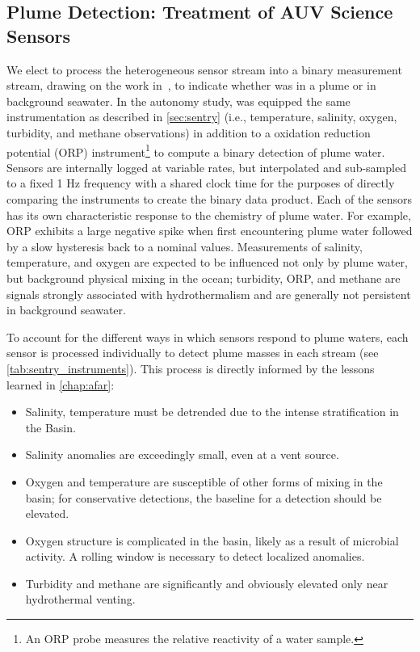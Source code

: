\subsection{Plume Detection: Treatment of AUV \Sentry Science Sensors}
\label{sec:field_sensor_models}
We elect to process the heterogeneous sensor stream into a binary measurement stream, drawing on the work in~\cite{jakuba2007stochastic}, to indicate whether \Sentry was in a plume or in background seawater. In the autonomy study, \Sentry was equipped the same instrumentation as described in \cref{sec:sentry} (i.e., temperature, salinity, oxygen, turbidity, and methane observations) in addition to a oxidation reduction potential (ORP) instrument\footnote{An ORP probe measures the relative reactivity of a water sample.} to compute a binary detection of plume water. Sensors are internally logged at variable rates, but interpolated and sub-sampled to a fixed 1 Hz frequency with a shared clock time for the purposes of directly comparing the instruments to create the binary data product. Each of the sensors has its own characteristic response to the chemistry of plume water. For example, ORP exhibits a large negative spike when first encountering plume water followed by a slow hysteresis back to a nominal values. Measurements of salinity, temperature, and oxygen are expected to be influenced not only by plume water, but background physical mixing in the ocean\autocite{li2020increasing,speer1989model}; turbidity, ORP, and methane are signals strongly associated with hydrothermalism and are generally not persistent in background seawater.

To account for the different ways in which sensors respond to plume waters, each sensor is processed individually to detect plume masses in each stream (see \cref{tab:sentry_instruments}). This process is directly informed by the lessons learned in \cref{chap:afar}:
\begin{itemize}
    \item Salinity, temperature must be detrended due to the intense stratification in the Basin.
    \item Salinity anomalies are exceedingly small, even at a vent source.
    \item Oxygen and temperature are susceptible of other forms of mixing in the basin; for conservative detections, the baseline for a detection should be elevated.
    \item Oxygen structure is complicated in the basin, likely as a result of microbial activity. A rolling window is necessary to detect localized anomalies.
    \item Turbidity and methane are significantly and obviously elevated only near hydrothermal venting.    
\end{itemize}

